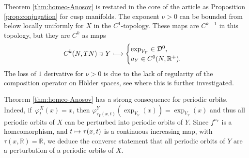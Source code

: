 \documentclass[10pt]{amsart}
\newcommand\mto{\mathchoice{\longmapsto}{\mapsto}{\mapsto}{\mapsto}}
\newcommand{\R}{\mathbb{R}}
\theoremstyle{plain}
\theoremstyle{definition}
\begin{document}
Theorem \ref{thm:homeo-Anosov} is restated in the core of the article as Proposition \ref{prop:conjugation} for cusp manifolds. The exponent $\nu > 0$ can be bounded from below locally uniformly for $X$ in the $C^1$-topology. These maps are $C^{k-1}$ in this topology, but they are $C^k$ as maps
\[
C^{k}(N,TN)\owns Y \mto \begin{cases} \exp_{V_Y} \in \mathcal{D}^0, \\ a_Y \in C^0(N,\R^+).
\end{cases}
\]
The loss of $1$ derivative for $\nu>0$ is due to the lack of regularity of the composition operator on H\"older spaces, see \cite{dlLlave-98} where this is further investigated.

Theorem \ref{thm:homeo-Anosov} has a strong consequence for periodic orbits. Indeed, if~\hbox{$\varphi^X_t(x) \!=\! x$}, then $\varphi^Y_{\tau_Y(x,t)}(\exp_{V_Y}(x))=\exp_{V_Y}(x)$ and thus all periodic orbits of $X$ can be perturbed into periodic orbits of $Y$. Since $f^{u_Y}$ is a homeomorphism, and $t\mto \tau(x, t)$ is a continuous increasing map, with $\tau(x,\R)=\R$, we deduce the converse statement that all periodic orbits of $Y$ are a perturbation of a periodic orbits of $X$.
\end{document}
